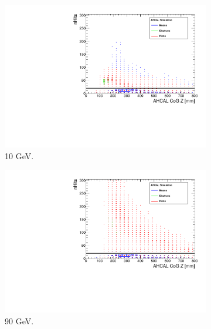 \begin{figure}[htbp!]
\begin{subfigure}[t]{0.5\textwidth}
		\centering
		\includegraphics[width=1\linewidth]{../Thesis_Plots/Timing/Pions/Plots/SelectionCut_nHitsCoGZ_10GeV}
		\caption{10 GeV.} \label{fig:pi10GeV_nHitsCoGZ}
	\end{subfigure}
	\hfill
	\begin{subfigure}[t]{0.5\textwidth}
		\centering
		\includegraphics[width=1\linewidth]{../Thesis_Plots/Timing/Pions/Plots/SelectionCut_nHitsCoGZ_90GeV}
		\caption{90 GeV.} \label{fig:pi90GeV_nHitsCoGZ}
	\end{subfigure}
	\hfill
	\begin{subfigure}[t]{0.5\textwidth}
		\centering

\end{subfigure}
\end{figure}
